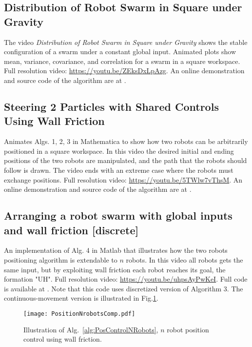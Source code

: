 \subsection{Distribution of Robot Swarm in Square under Gravity }
The video \emph{Distribution of Robot Swarm in Square under Gravity } shows the stable configuration of a swarm under a constant global input.  Animated plots show mean, variance, covariance, and correlation for a swarm in a square workspace.
Full resolution video: \url{https://youtu.be/ZEksDxLpAzg}.
An online demonstration and source code of the algorithm are at \citet{Zhao2016mathematica}.


\subsection{Steering 2 Particles with Shared Controls Using Wall Friction}
Animates Algs. 1, 2, 3 in Mathematica to show how two robots can be arbitrarily positioned in a square workspace. In this video the desired initial and ending positions of the two robots are manipulated, and the path that the robots should follow is drawn. The video ends with an extreme case where the robots must exchange positions. 
Full resolution video: \url{https://youtu.be/5TWlw7vThsM}.
An online demonstration and source code of the algorithm are at \citet{Shahrokhi2015mathematicaParticle}.

\subsection{Arranging a robot swarm with global inputs and wall friction [discrete] }
An implementation of Alg. 4  in {\sc Matlab} that illustrates how the two robots positioning algorithm is extendable to $n$ robots. In this video all  robots gets the same input, but by exploiting wall friction each robot reaches its goal, the formation "UH".
Full resolution video: \url{https://youtu.be/uhpsAyPwKeI}.
Full code is available at \citet{Arun2015}.
Note that this code uses discretized version of Algorithm 3.  The continuous-movement version is illustrated in Fig.\ref{fig:PositionNrobotsCont}.
\begin{figure}
\begin{center}
	\texttt{[image: PositionNrobotsComp.pdf]}
\end{center}
\vspace{-1em}
\caption{\label{fig:PositionNrobotsCont}
Illustration of Alg.\ \ref{alg:PosControlNRobots}, $n$ robot position control  using wall friction.
}
\end{figure}




